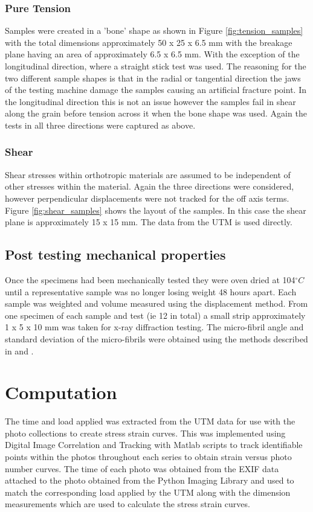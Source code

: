 \documentclass[10pt]{article}
\begin{document}
\subsubsection{Pure Tension}
Samples were created in a 'bone' shape as shown in Figure \ref{fig:tension_samples} with the total dimensions approximately 50 x 25 x 6.5 mm with the breakage plane having an area of approximately 6.5 x 6.5 mm. With the exception of the longitudinal direction, where a straight stick test was used. The reasoning for the two different sample shapes is that in the radial or tangential direction the jaws of the testing machine damage the samples causing an artificial fracture point. In the longitudinal direction this is not an issue however the samples fail in shear along the grain before tension across it when the bone shape was used. Again the tests in all three directions were captured as above.

\subsubsection{Shear}
Shear stresses within orthotropic materials are assumed to be independent of other stresses within the material. Again the three directions were considered, however perpendicular displacements were not tracked for the off axis terms. Figure \ref{fig:shear_samples} shows the layout of the samples. In this case the shear plane is approximately 15 x 15 mm. The data from the UTM is used directly.

\subsection{Post testing mechanical properties}
Once the specimens had been mechanically tested they were oven dried at 104\(^\circ C\) until a representative sample was no longer losing weight 48 hours apart. Each sample was weighted and volume measured using the displacement method. From one specimen of each sample and test (ie 12 in total) a small strip approximately 1 x 5 x 10 mm was taken for x-ray diffraction testing. The micro-fibril angle and standard deviation of the micro-fibrils were obtained using the methods described in \citet{cave_measuring_1998} and \citet{cave_interpretation_1998}.

\section{Computation}
The time and load applied was extracted from the UTM data for use with the photo collections to create stress strain curves. This was implemented using Digital Image Correlation and Tracking with Matlab scripts \citep{chris_eberl_robert_thompson_daniel_gianola_digital_2006} to track identifiable points within the photos throughout each series to obtain strain  versus photo number curves. The time of each photo was obtained from the EXIF data attached to the photo obtained from the Python Imaging Library \citep{lundh_python_1995} and used to match the corresponding load applied by the UTM along with the dimension measurements which are used to calculate the stress strain curves.
\end{document}
